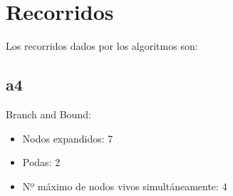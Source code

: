 \documentclass[a4]{article}
\begin{document}
\begin{figure}[H]
  \centering
\end{figure}

\section{Recorridos}
Los recorridos dados por los algoritmos son:

\subsection{a4}
\setcounter{subfigure}{0}

Branch and Bound:
\begin{itemize}
\item Nodos expandidos: 7
\item Podas: 2
\item Nº máximo de nodos vivos simultáneamente: 4 
\end{itemize}
\end{document}
